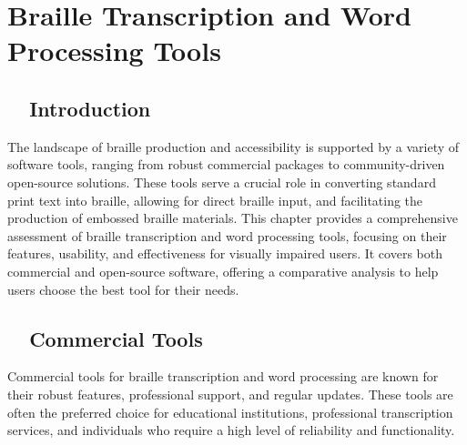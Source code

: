 \chapter{Braille Transcription and Word Processing Tools}\label{ch12:braille-transcription}


\section{~~Introduction}\label{ch12:sec:introduction}
The landscape of braille production and accessibility is supported by a variety of software tools, ranging from robust commercial packages to community-driven open-source solutions. These tools serve a crucial role in converting standard print text into braille, allowing for direct braille input, and facilitating the production of embossed braille materials. This chapter provides a comprehensive assessment of braille transcription and word processing tools, focusing on their features, usability, and effectiveness for visually impaired users. It covers both commercial and open-source software, offering a comparative analysis to help users choose the best tool for their needs.

\section{~~Commercial Tools}\label{ch12:sec:commercial-tools}
Commercial tools for braille transcription and word processing are known for their robust features, professional support, and regular updates. These tools are often the preferred choice for educational institutions, professional transcription services, and individuals who require a high level of reliability and functionality.


